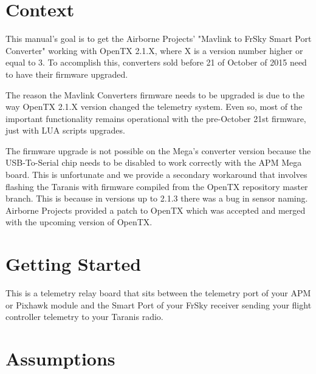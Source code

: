 \documentclass[english]{article}
\begin{document}

\clearpage
\tableofcontents
\clearpage
{}
\setcounter{page}{1}
\section{Context}

This manual's goal is to get the Airborne Projects' "Mavlink to FrSky Smart Port Converter" working with OpenTX 2.1.X, where X is a version number higher or equal to 3. To accomplish this, converters sold before 21 of October of 2015 need to have their firmware upgraded.

The reason the Mavlink Converters firmware needs to be upgraded is due to the way OpenTX 2.1.X version changed the telemetry system. Even so, most of the important functionality remains operational with the pre-October 21st firmware, just with LUA scripts upgrades.

The firmware upgrade is not possible on the Mega's converter version because the USB-To-Serial chip needs to be disabled to work correctly with the APM Mega board. This is unfortunate and we provide a secondary workaround that involves flashing the Taranis with firmware compiled from the OpenTX repository master branch. This is because in versions up to 2.1.3 there was a bug in sensor naming. Airborne Projects provided a patch to OpenTX which was accepted and merged with the upcoming version of OpenTX.

\section{Getting Started}

This is a telemetry relay board that sits between the telemetry port of your APM or Pixhawk module and the Smart Port of your FrSky receiver sending your flight controller telemetry to your Taranis radio.



\section{Assumptions}
\end{document}
